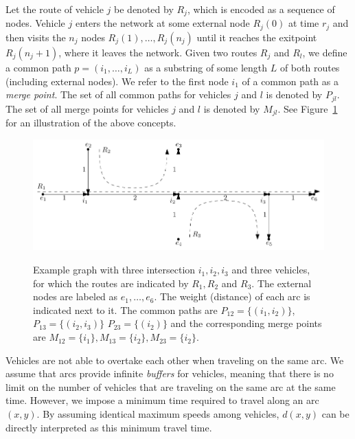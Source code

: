 \documentclass{article}
\theoremstyle{definition}
\theoremstyle{plain}
\begin{document}
Let the route of vehicle $j$ be denoted by $R_{j}$, which is encoded as a
sequence of nodes. Vehicle $j$ enters the network at some external node
$R_{j}(0)$ at time $r_{j}$ and then visits the $n_{j}$ nodes
$R_{j}(1), \dots, R_{j}(n_{j})$ until it reaches the exitpoint
$R_{j}(n_{j} + 1)$, where it leaves the network.
Given two routes $R_{j}$ and $R_{l}$, we define a common path
$p=(i_{1},\dots,i_{L})$ as a substring of some length $L$ of both routes
(including external nodes). We refer to the first node $i_{1}$ of a common path
as a \textit{merge point}. The set of all common paths for vehicles $j$ and $l$
is denoted by $P_{jl}$. The set of all merge points for vehicles $j$ and $l$ is
denoted by $M_{jl}$. See Figure~\ref{fig:intersection-graph-example} for an
illustration of the above concepts.

\begin{figure}[t]
  \centering
  \includegraphics[width=1.0\textwidth]{figures/intersection-graph-example.pdf}
  \label{fig:intersection-graph-example}
  \caption{Example graph with three intersection $i_{1}, i_{2}, i_{3}$ and three
    vehicles, for which the routes are indicated by $R_{1}, R_{2}$ and $R_{3}$.
    The external nodes are labeled as $e_{1}, \dots, e_{6}$. The weight
    (distance) of each arc is indicated next to it. The common paths are
    $P_{12} = \{ (i_{1}, i_{2}) \}$, $P_{13} = \{ (i_{2}, i_{3}) \}$
    $P_{23} = \{ (i_{2}) \}$ and the corresponding merge points are
    $M_{12} = \{ i_{1} \}, M_{13} = \{ i_{2} \}, M_{23} = \{ i_{2} \}$.}
\end{figure}

Vehicles are not able to overtake each other when traveling on the same arc. We
assume that arcs provide infinite \textit{buffers} for vehicles, meaning that
there is no limit on the number of vehicles that are traveling on the same arc
at the same time. However, we impose a minimum time required to travel along an
arc $(x,y)$. By assuming identical maximum speeds among vehicles, $d(x,y)$ can
be directly interpreted as this minimum travel time.
\end{document}
